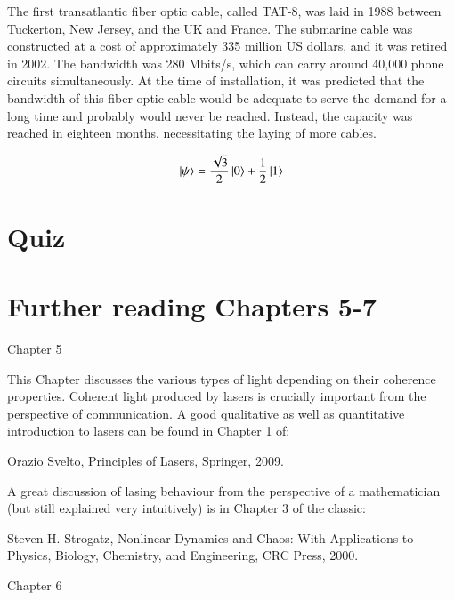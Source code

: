 The first transatlantic fiber optic cable, called TAT-8, was laid in 1988 between Tuckerton, New Jersey, and the UK and France.
The submarine cable was constructed at a cost of approximately 335 million US dollars, and it was retired in 2002.
The bandwidth was 280 Mbits/s, which can carry around 40,000 phone circuits simultaneously. At the time of installation, it was predicted that the bandwidth of this fiber optic cable would be adequate to serve the demand for a long time and probably would never be reached.
Instead, the capacity was reached in eighteen months, necessitating the laying of more cables.

\newpage
\begin{exercises}
\begin{equation*}
\left| \psi \right\rangle = \frac{\sqrt{3}}{2}\left| 0 \right\rangle + \frac{1}{2}\left| 1 \right\rangle
\end{equation*}


\end{exercises}

\newpage
\section*{Quiz}

\section*{Further reading Chapters 5-7}

Chapter 5

This Chapter discusses the various types of light depending on their coherence properties. Coherent light produced by lasers is crucially important from the perspective of communication. A good qualitative as well as quantitative introduction to lasers can be found in Chapter 1 of:

Orazio Svelto, Principles of Lasers, Springer, 2009.

A great discussion of lasing behaviour from the perspective of a mathematician (but still explained very intuitively) is in Chapter 3 of the classic:

Steven H. Strogatz, Nonlinear Dynamics and Chaos: With Applications to Physics, Biology, Chemistry, and Engineering, CRC Press, 2000.

Chapter 6

